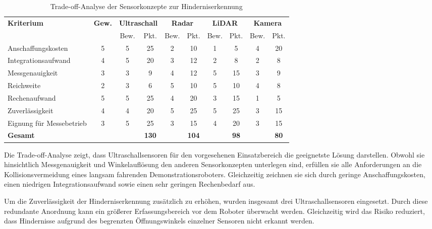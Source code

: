 \begin{table}[H]
	\centering
	\caption{Trade-off-Analyse der Sensorkonzepte zur Hinderniserkennung}
	\label{tab:tradeoff_sensorik}
	\renewcommand{\arraystretch}{1.25}
	\begin{tabular}{lccccccccc}
		\toprule
		\textbf{Kriterium} &
		\textbf{Gew.} &
		\multicolumn{2}{c}{\textbf{Ultraschall}} &
		\multicolumn{2}{c}{\textbf{Radar}} &
		\multicolumn{2}{c}{\textbf{LiDAR}} &
		\multicolumn{2}{c}{\textbf{Kamera}}\\
		
		\cmidrule(lr){3-4}
		\cmidrule(lr){5-6}
		\cmidrule(lr){7-8}
		\cmidrule(lr){9-10}
		
		&
		&
		Bew.
		&
		Pkt.
		&
		Bew.
		&
		Pkt.
		&
		Bew.
		&
		Pkt.
		&
		Bew.
		&
		Pkt.
		\\
		
		\midrule
		
		Anschaffungskosten      &5&5&25&2&10&1&5&4&20\\
		Integrationsaufwand     &4&5&20&3&12&2&8&2&8\\
		Messgenauigkeit         &3&3&9&4&12&5&15&3&9\\
		Reichweite              &2&3&6&5&10&5&10&4&8\\
		Rechenaufwand           &5&5&25&4&20&3&15&1&5\\
		Zuverlässigkeit         &4&4&20&5&25&5&25&3&15\\
		Eignung für Messebetrieb&3&5&25&3&15&4&20&3&15\\
		
		\midrule
		
		\textbf{Gesamt} &&
		&
		\textbf{130}
		&
		&
		\textbf{104}
		&
		&
		\textbf{98}
		&
		&
		\textbf{80}
		
		\\
		
		\bottomrule
	\end{tabular}
\end{table}

Die Trade-off-Analyse zeigt, dass Ultraschallsensoren für den vorgesehenen Einsatzbereich die geeignetste Lösung darstellen. Obwohl sie hinsichtlich Messgenauigkeit und Winkelauflösung den anderen Sensorkonzepten unterlegen sind, erfüllen sie alle Anforderungen an die Kollisionsvermeidung eines langsam fahrenden Demonstrationsroboters. Gleichzeitig zeichnen sie sich durch geringe Anschaffungskosten, einen niedrigen Integrationsaufwand sowie einen sehr geringen Rechenbedarf aus.

Um die Zuverlässigkeit der Hinderniserkennung zusätzlich zu erhöhen, wurden insgesamt drei Ultraschallsensoren eingesetzt. Durch diese redundante Anordnung kann ein größerer Erfassungsbereich vor dem Roboter überwacht werden. Gleichzeitig wird das Risiko reduziert, dass Hindernisse aufgrund des begrenzten Öffnungswinkels einzelner Sensoren nicht erkannt werden.



